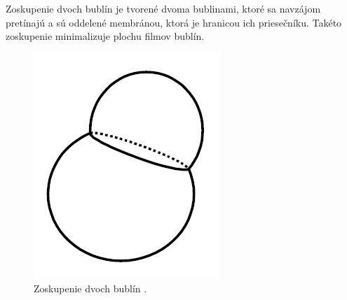 Zoskupenie dvoch bublín je tvorené dvoma bublinami, ktoré sa navzájom pretínajú a sú oddelené membránou, ktorá je hranicou ich priesečníku. Takéto zoskupenie minimalizuje plochu filmov bublín. 
\begin{figure}[H]
	\begin{center}
		\includegraphics[height=\imageHeight]{images/durikovic/double_bubble}
		\caption{Zoskupenie dvoch bublín \cite{durikovic2001}.}
		\label{img:double_bubble}
	\end{center}
\end{figure}


